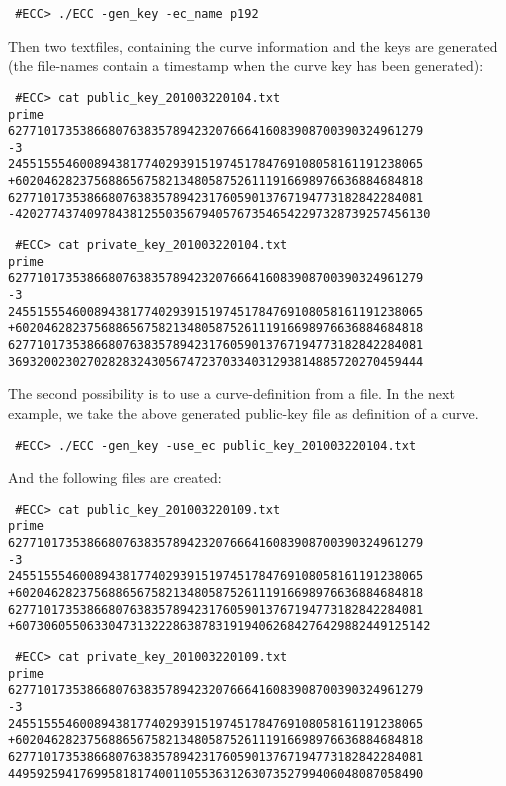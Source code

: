 \documentclass[11pt,english]{article}
\begin{document}
\begin{verbatim}
 #ECC> ./ECC -gen_key -ec_name p192
\end{verbatim}

Then two textfiles, containing the curve information and the keys are generated (the file-names contain a timestamp when the curve key has been generated):

\begin{verbatim}
 #ECC> cat public_key_201003220104.txt
prime
6277101735386680763835789423207666416083908700390324961279
-3
2455155546008943817740293915197451784769108058161191238065
+602046282375688656758213480587526111916698976636884684818
6277101735386680763835789423176059013767194773182842284081
-4202774374097843812550356794057673546542297328739257456130
\end{verbatim}

\begin{verbatim}
 #ECC> cat private_key_201003220104.txt
prime
6277101735386680763835789423207666416083908700390324961279
-3
2455155546008943817740293915197451784769108058161191238065
+602046282375688656758213480587526111916698976636884684818
6277101735386680763835789423176059013767194773182842284081
3693200230270282832430567472370334031293814885720270459444
\end{verbatim}

The second possibility is to use a curve-definition from a file. In the next example, we take the above generated public-key file as definition of a curve.

\begin{verbatim}
 #ECC> ./ECC -gen_key -use_ec public_key_201003220104.txt
\end{verbatim}

And the following files are created:

\begin{verbatim}
 #ECC> cat public_key_201003220109.txt
prime
6277101735386680763835789423207666416083908700390324961279
-3
2455155546008943817740293915197451784769108058161191238065
+602046282375688656758213480587526111916698976636884684818
6277101735386680763835789423176059013767194773182842284081
+6073060550633047313222863878319194062684276429882449125142
\end{verbatim}
\begin{verbatim}
 #ECC> cat private_key_201003220109.txt
prime
6277101735386680763835789423207666416083908700390324961279
-3
2455155546008943817740293915197451784769108058161191238065
+602046282375688656758213480587526111916698976636884684818
6277101735386680763835789423176059013767194773182842284081
4495925941769958181740011055363126307352799406048087058490
\end{verbatim}
\end{document}
